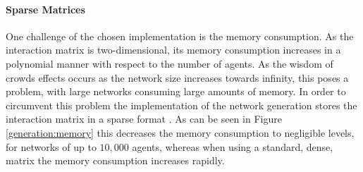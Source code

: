 \documentclass[a4paper, 12pt]{report}
\begin{document}

\newpage

\paragraph{Sparse Matrices}

One challenge of the chosen implementation is the memory consumption. As the interaction matrix is two-dimensional, its memory consumption increases in a polynomial manner with respect to the number of agents. As the wisdom of crowds effects occurs as the network size increases towards infinity, this poses a problem, with large networks consuming large amounts of memory. In order to circumvent this problem the implementation of the network generation stores the interaction matrix in a sparse format \parencite{2020SciPy-NMeth}. As can be seen in Figure \ref{generation:memory} this decreases the memory consumption to negligible levels, for networks of up to $10,000$ agents, whereas when using a standard, dense, matrix the memory consumption increases rapidly.
\end{document}
